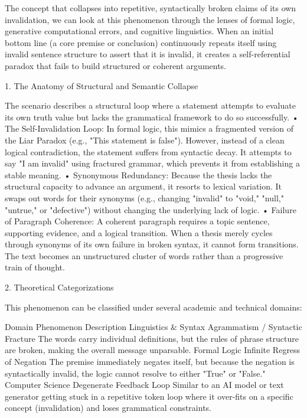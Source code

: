 The concept  that collapses into repetitive, syntactically broken claims of its own invalidation, we can look at this phenomenon through the lenses of formal logic, generative computational errors, and cognitive linguistics.
When an initial bottom line (a core premise or conclusion) continuously repeats itself using invalid sentence structure to assert that it is invalid, it creates a self-referential paradox that fails to build structured or coherent arguments.

1. The Anatomy of Structural and Semantic Collapse

The scenario describes a structural loop where a statement attempts to evaluate its own truth value but lacks the grammatical framework to do so successfully.
• The Self-Invalidation Loop: In formal logic, this mimics a fragmented version of the Liar Paradox (e.g., "This statement is false"). However, instead of a clean logical contradiction, the statement suffers from syntactic decay. It attempts to say "I am invalid" using fractured grammar, which prevents it from establishing a stable meaning.
• Synonymous Redundancy: Because the thesis lacks the structural capacity to advance an argument, it resorts to lexical variation. It swaps out words for their synonyms (e.g., changing "invalid" to "void," "null," "untrue," or "defective") without changing the underlying lack of logic.
• Failure of Paragraph Coherence: A coherent paragraph requires a topic sentence, supporting evidence, and a logical transition. When a thesis merely cycles through synonyms of its own failure in broken syntax, it cannot form transitions. The text becomes an unstructured cluster of words rather than a progressive train of thought.

2. Theoretical Categorizations

This phenomenon can be classified under several academic and technical domains:

Domain	Phenomenon	Description
Linguistics & Syntax	Agrammatism / Syntactic Fracture	The words carry individual definitions, but the rules of phrase structure are broken, making the overall message unparsable.
Formal Logic	Infinite Regress of Negation	The premise immediately negates itself, but because the negation is syntactically invalid, the logic cannot resolve to either "True" or "False."
Computer Science	Degenerate Feedback Loop	Similar to an AI model or text generator getting stuck in a repetitive token loop where it over-fits on a specific concept (invalidation) and loses grammatical constraints.


